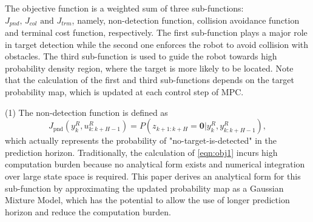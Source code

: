 \documentclass[twocolumn,10pt]{asme2e}
\begin{document}
The objective function is a weighted sum of three sub-functions: $J_{pnd},\,J_{col}\text{ and }J_{trm}$, namely, non-detection function, collision avoidance function and terminal cost function, respectively.
The first sub-function plays a major role in target detection while 
the second one enforces the robot to avoid collision with obstacles.
The third sub-function is used to guide the robot towards high probability density region, where the target is more likely to be located.
Note that the calculation of the first and third sub-functions depends on the target probability map, which is updated at each control step of MPC.

(1) The non-detection function is defined as
\begin{equation}\label{eqn:obj1}
J_\text{pnd}(y^R_k,u^R_{k:k+H-1})=P(z_{k+1:k+H}=\mathbf{0}|y^R_k,y^R_{k:k+H-1}),
\end{equation}
which actually represents the probability of "no-target-is-detected" in the prediction horizon.
Traditionally, the calculation of \cref{eqn:obj1} incurs high computation burden because no analytical form exists and numerical integration over large state space is required.
This paper derives an analytical form for this sub-function by approximating the updated probability map as a Gaussian Mixture Model, which has the potential to allow the use of longer prediction horizon and reduce the computation burden.
\end{document}

